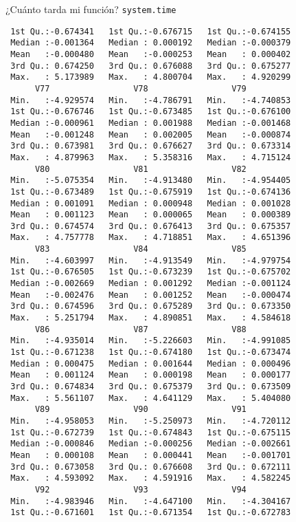 \documentclass[xcolor={usenames,svgnames,dvipsnames}]{beamer}
\begin{document}
\begin{frame}[label={sec:org4ea8038},fragile]{¿Cuánto tarda mi función? \texttt{system.time}}
\begin{verbatim}
 1st Qu.:-0.674341   1st Qu.:-0.676715   1st Qu.:-0.674155  
 Median :-0.001364   Median : 0.000192   Median :-0.000379  
 Mean   :-0.000480   Mean   :-0.000253   Mean   : 0.000402  
 3rd Qu.: 0.674250   3rd Qu.: 0.676088   3rd Qu.: 0.675277  
 Max.   : 5.173989   Max.   : 4.800704   Max.   : 4.920299  
      V77                 V78                 V79           
 Min.   :-4.929574   Min.   :-4.786791   Min.   :-4.740853  
 1st Qu.:-0.676746   1st Qu.:-0.673485   1st Qu.:-0.676100  
 Median :-0.000961   Median : 0.001988   Median :-0.001468  
 Mean   :-0.001248   Mean   : 0.002005   Mean   :-0.000874  
 3rd Qu.: 0.673981   3rd Qu.: 0.676627   3rd Qu.: 0.673314  
 Max.   : 4.879963   Max.   : 5.358316   Max.   : 4.715124  
      V80                 V81                 V82           
 Min.   :-5.075354   Min.   :-4.913480   Min.   :-4.954405  
 1st Qu.:-0.673489   1st Qu.:-0.675919   1st Qu.:-0.674136  
 Median : 0.001091   Median : 0.000948   Median : 0.001028  
 Mean   : 0.001123   Mean   : 0.000065   Mean   : 0.000389  
 3rd Qu.: 0.674574   3rd Qu.: 0.676413   3rd Qu.: 0.675357  
 Max.   : 4.757778   Max.   : 4.718851   Max.   : 4.651396  
      V83                 V84                 V85           
 Min.   :-4.603997   Min.   :-4.913549   Min.   :-4.979754  
 1st Qu.:-0.676505   1st Qu.:-0.673239   1st Qu.:-0.675702  
 Median :-0.002669   Median : 0.001292   Median :-0.001124  
 Mean   :-0.002476   Mean   : 0.001252   Mean   :-0.000474  
 3rd Qu.: 0.674596   3rd Qu.: 0.675289   3rd Qu.: 0.673350  
 Max.   : 5.251794   Max.   : 4.890851   Max.   : 4.584618  
      V86                 V87                 V88           
 Min.   :-4.935014   Min.   :-5.226603   Min.   :-4.991085  
 1st Qu.:-0.671238   1st Qu.:-0.674180   1st Qu.:-0.673474  
 Median : 0.000475   Median : 0.001644   Median : 0.000496  
 Mean   : 0.001124   Mean   : 0.000198   Mean   : 0.000177  
 3rd Qu.: 0.674834   3rd Qu.: 0.675379   3rd Qu.: 0.673509  
 Max.   : 5.561107   Max.   : 4.641129   Max.   : 5.404080  
      V89                 V90                 V91           
 Min.   :-4.958053   Min.   :-5.250973   Min.   :-4.720112  
 1st Qu.:-0.672739   1st Qu.:-0.674843   1st Qu.:-0.675115  
 Median :-0.000846   Median :-0.000256   Median :-0.002661  
 Mean   : 0.000108   Mean   : 0.000441   Mean   :-0.001701  
 3rd Qu.: 0.673058   3rd Qu.: 0.676608   3rd Qu.: 0.672111  
 Max.   : 4.593092   Max.   : 4.591916   Max.   : 4.582245  
      V92                 V93                 V94           
 Min.   :-4.983946   Min.   :-4.647100   Min.   :-4.304167  
 1st Qu.:-0.671601   1st Qu.:-0.671354   1st Qu.:-0.672783  

\end{verbatim}
\end{frame}
\end{document}
